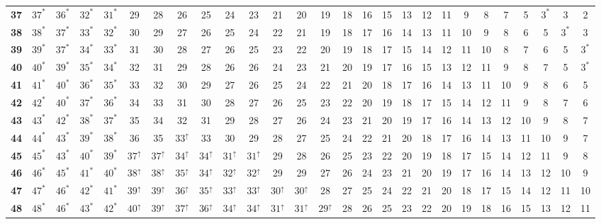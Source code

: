 \begin{landscape}
{\begin{table}
\begin{tabular}{|c| c c c c c c c c c c c c c c c c c c c c c c c c c c |}
\textbf{37} & $37^*$ & $36^*$ & $32^*$ & $31^*$ & 29 & 28 & 26 & 25 & 24 & 23 & 21 & 20 & 19 & 18 & 16 & 15 & 13 & 12 & 11 & 9 & 8 & 7 & 5 & $3^*$ & 3 & 2 \\
\textbf{38} & $38^*$ & $37^*$ & $33^*$ & $32^*$ & 30 & 29 & 27 & 26 & 25 & 24 & 22 & 21 & 19 & 18 & 17 & 16 & 14 & 13 & 11 & 10 & 9 & 8 & 6 & 5 & $3^*$ & 3 \\
\textbf{39} & $39^*$ & $37^*$ & $34^*$ & $33^*$ & 31 & 30 & 28 & 27 & 26 & 25 & 23 & 22 & 20 & 19 & 18 & 17 & 15 & 14 & 12 & 11 & 10 & 8 & 7 & 6 & 5 & $3^*$ \\
\textbf{40} & $40^*$ & $39^*$ & $35^*$ & $34^*$ & 32 & 31 & 29 & 28 & 26 & 26 & 24 & 23 & 21 & 20 & 19 & 17 & 16 & 15 & 13 & 12 & 11 & 9 & 8 & 7 & 5 & $3^*$ \\
\textbf{41} & $41^*$ & $40^*$ & $36^*$ & $35^*$ & 33 & 32 & 30 & 29 & 27 & 26 & 25 & 24 & 22 & 21 & 20 & 18 & 17 & 16 & 14 & 13 & 11 & 10 & 9 & 8 & 6 & 5 \\
\textbf{42} & $42^*$ & $40^*$ & $37^*$ & $36^*$ & 34 & 33 & 31 & 30 & 28 & 27 & 26 & 25 & 23 & 22 & 20 & 19 & 18 & 17 & 15 & 14 & 12 & 11 & 9 & 8 & 7 & 6 \\
\textbf{43} & $43^*$ & $42^*$ & $38^*$ & $37^*$ & 35 & 34 & 32 & 31 & 29 & 28 & 27 & 26 & 24 & 23 & 21 & 20 & 19 & 17 & 16 & 14 & 13 & 12 & 10 & 9 & 8 & 7 \\
\textbf{44} & $44^*$ & $43^*$ & $39^*$ & $38^*$ & 36 & 35 & $33^\uparrow$ & 33 & 30 & 29 & 28 & 27 & 25 & 24 & 22 & 21 & 20 & 18 & 17 & 16 & 14 & 13 & 11 & 10 & 9 & 7 \\
\textbf{45} & $45^*$ & $43^*$ & $40^*$ & $39^*$ & $37^\uparrow$ & $37^\uparrow$ & $34^\uparrow$ & $34^\uparrow$ & $31^\uparrow$ & $31^\uparrow$ & 29 & 28 & 26 & 25 & 23 & 22 & 20 & 19 & 18 & 17 & 15 & 14 & 12 & 11 & 9 & 8 \\
\textbf{46} & $46^*$ & $45^*$ & $41^*$ & $40^*$ & $38^\uparrow$ & $38^\uparrow$ & $35^\uparrow$ & $34^\uparrow$ & $32^\uparrow$ & $32^\uparrow$ & 29 & 29 & 27 & 26 & 24 & 23 & 21 & 20 & 19 & 17 & 16 & 14 & 13 & 12 & 10 & 9 \\
\textbf{47} & $47^*$ & $46^*$ & $42^*$ & $41^*$ & $39^\uparrow$ & $39^\uparrow$ & $36^\uparrow$ & $35^\uparrow$ & $33^\uparrow$ & $33^\uparrow$ & $30^\uparrow$ & $30^\uparrow$ & 28 & 27 & 25 & 24 & 22 & 21 & 20 & 18 & 17 & 15 & 14 & 12 & 11 & 10 \\
\textbf{48} & $48^*$ & $46^*$ & $43^*$ & $42^*$ & $40^\uparrow$ & $39^\uparrow$ & $37^\uparrow$ & $36^\uparrow$ & $34^\uparrow$ & $34^\uparrow$ & $31^\uparrow$ & $31^\uparrow$ & $29^\uparrow$ & 28 & 26 & 25 & 23 & 22 & 20 & 19 & 18 & 16 & 15 & 13 & 12 & 11 \\

\end{tabular}
\end{table}}
\end{landscape}

